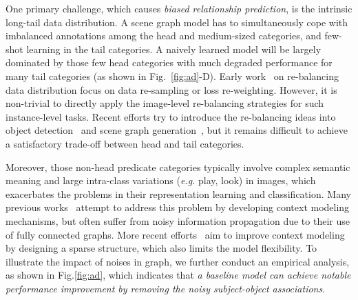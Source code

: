 One primary challenge, which causes \textit{biased relationship prediction}, is the intrinsic long-tail data distribution. A scene graph model has to simultaneously cope with imbalanced annotations among the head and medium-sized categories, and few-shot learning in the tail categories. A naively learned model will be largely dominated by those few head categories with much degraded performance for many tail categories (as shown in Fig.~\ref{fig:ad}-D). Early work~\cite{cao_learning_2019,cui_class-balanced_2019} on re-balancing data distribution focus on data re-sampling or loss re-weighting. However, it is non-trivial to directly apply the image-level re-balancing strategies for such instance-level tasks. Recent efforts try to introduce the re-balancing ideas into object detection~\cite{gupta_lvis:_2019,tan_equalization_2020} and scene graph generation~\cite{tang_unbiased_2020}, but it remains difficult to achieve a satisfactory trade-off between head and tail categories.




 
Moreover, those non-head predicate categories typically involve complex semantic meaning and large intra-class variations (\textit{e.g.} play, look) in images, which exacerbates the problems in their representation learning and classification. Many previous works~\cite{zellers_neural_2017, xu_scene_2017, li_scene_2017, tang_learning_2018,yang_graph_2018,lin_gps-net_2020} attempt to address this problem by developing context modeling mechanisms, but often suffer from noisy information propagation due to their use of fully connected graphs. 
More recent efforts~\cite{qi_attentive_2018,yang_graph_2018,tang_learning_2018,wang_sketching_2020} aim to improve context modeling by designing a sparse structure, which also limits the model flexibility. To illustrate the impact of noises in graph, we further conduct an empirical analysis, as shown in Fig.\ref{fig:ad}, which indicates that \textit{a baseline model can achieve notable performance improvement by removing the noisy subject-object associations}.


